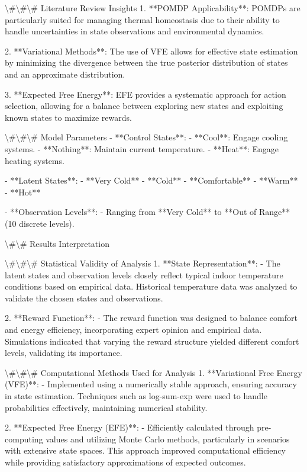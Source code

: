 \documentclass[11pt,a4paper]{article}
\begin{document}
\textbackslash{}#\textbackslash{}#\textbackslash{}# Literature Review Insights
1. **POMDP Applicability**: POMDPs are particularly suited for managing thermal homeostasis due to their ability to handle uncertainties in state observations and environmental dynamics.
   
2. **Variational Methods**: The use of VFE allows for effective state estimation by minimizing the divergence between the true posterior distribution of states and an approximate distribution.

3. **Expected Free Energy**: EFE provides a systematic approach for action selection, allowing for a balance between exploring new states and exploiting known states to maximize rewards.

\textbackslash{}#\textbackslash{}#\textbackslash{}# Model Parameters
- **Control States**:
  - **Cool**: Engage cooling systems.
  - **Nothing**: Maintain current temperature.
  - **Heat**: Engage heating systems.

- **Latent States**:
  - **Very Cold**
  - **Cold**
  - **Comfortable**
  - **Warm**
  - **Hot**

- **Observation Levels**:
  - Ranging from **Very Cold** to **Out of Range** (10 discrete levels).

\textbackslash{}#\textbackslash{}# Results Interpretation

\textbackslash{}#\textbackslash{}#\textbackslash{}# Statistical Validity of Analysis
1. **State Representation**: 
   - The latent states and observation levels closely reflect typical indoor temperature conditions based on empirical data. Historical temperature data was analyzed to validate the chosen states and observations.

2. **Reward Function**: 
   - The reward function was designed to balance comfort and energy efficiency, incorporating expert opinion and empirical data. Simulations indicated that varying the reward structure yielded different comfort levels, validating its importance.

\textbackslash{}#\textbackslash{}#\textbackslash{}# Computational Methods Used for Analysis
1. **Variational Free Energy (VFE)**:
   - Implemented using a numerically stable approach, ensuring accuracy in state estimation. Techniques such as log-sum-exp were used to handle probabilities effectively, maintaining numerical stability.

2. **Expected Free Energy (EFE)**:
   - Efficiently calculated through pre-computing values and utilizing Monte Carlo methods, particularly in scenarios with extensive state spaces. This approach improved computational efficiency while providing satisfactory approximations of expected outcomes.
\end{document}
